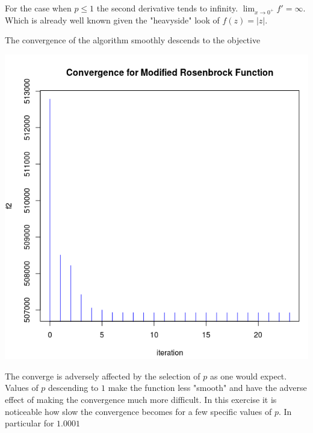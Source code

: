 For the case when $p \leq 1$ the second derivative tends to infinity. $\displaystyle \lim_{x \to 0^+} {f' = \infty}$. Which is already well known given the "heavyside" look of $f(z) = |z|$.

The convergence of the algorithm smoothly descends to the objective 

\begin{center}
\includegraphics[scale=0.3]{Figures/convergence.png}
\end{center}

The converge is adversely affected by the selection of $p$ as one would expect. Values of $p$ descending to $1$ make the function less "smooth" and have the adverse effect of making the convergence much more difficult. In this exercise it is noticeable how slow the convergence becomes for a few specific values of $p$. In particular for $1.0001$

